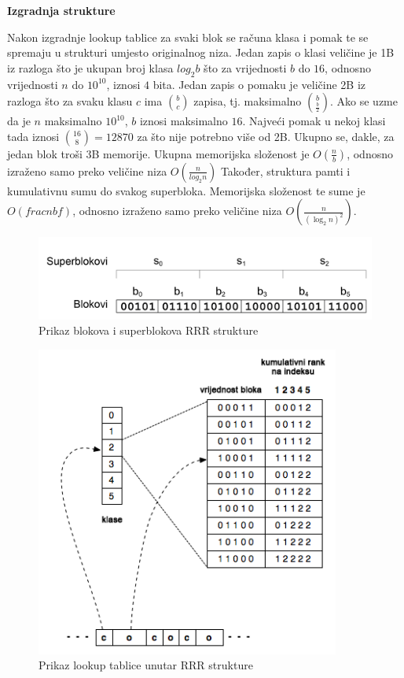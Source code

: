 \documentclass[times, utf8, seminar, numeric]{fer}
\begin{document}
\textbf{Izgradnja strukture}

Nakon izgradnje lookup tablice za svaki blok se računa klasa i pomak te se spremaju u strukturi umjesto originalnog niza. Jedan zapis o klasi veličine je 1B iz razloga što je ukupan broj klasa $log_2b$ što za vrijednosti $b$ do $16$, odnosno vrijednosti $n$ do $10^{10}$, iznosi $4$ bita. Jedan zapis o pomaku je veličine 2B iz razloga što za svaku klasu $c$ ima $\binom{b}{c}$ zapisa, tj. maksimalno $\binom{b}{\frac{b}{2}}$. Ako se uzme da je $n$ maksimalno $10^{10}$, $b$ iznosi maksimalno $16$. Najveći pomak u nekoj klasi tada iznosi $\binom{16}{8}=12870$ za što nije potrebno više od 2B.  Ukupno se, dakle, za jedan blok troši 3B memorije. Ukupna memorijska složenost je $O(\frac{n}{b})$, odnosno izraženo samo preko veličine niza $O(\frac{n}{log_2n})$
Također, struktura pamti i kumulativnu sumu do svakog superbloka. Memorijska složenost te sume je $O(frac{n}{b f})$, odnosno izraženo samo preko veličine niza $O(\frac{n}{(\log_2n)^2})$.

\begin{figure}[ht]
	\centering
	\includegraphics[width=15cm]{img/rrr_blocks.png}
	\caption{Prikaz blokova i superblokova RRR strukture}
	\label{fig:rrr}
\end{figure}

\begin{figure}[ht]
	\centering
	\includegraphics[width=10cm]{img/rrr-binary-table.png}
	\caption{Prikaz lookup tablice unutar RRR strukture}
	\label{fig:lookup}
\end{figure}
\end{document}
